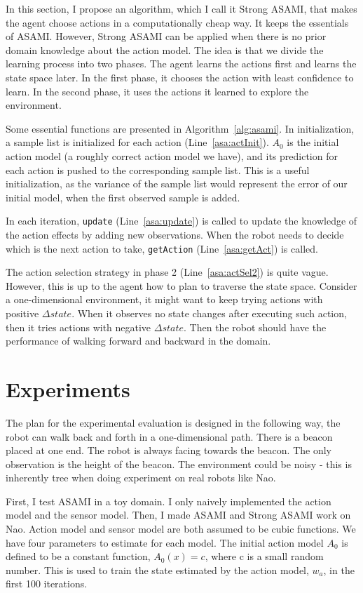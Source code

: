 \documentclass[10pt]{article}
\begin{document}
In this section, I propose an algorithm, which I call it Strong ASAMI,
that makes the agent choose actions in a computationally cheap way.
It keeps the essentials of ASAMI\@. However, Strong ASAMI can be applied
when there is no prior domain knowledge about the action model. The
idea is that we divide the learning process into two phases. The agent
learns the actions first and learns the state space later. In the
first phase, it chooses the action with least confidence to learn. In
the second phase, it uses the actions it learned to explore the
environment.

Some essential functions are presented in Algorithm~\ref{alg:asami}.
In initialization, a sample list is initialized for each action
(Line~\ref{asa:actInit}). $A_0$ is the initial action model (a roughly
correct action model we have), and its prediction for each action is
pushed to the corresponding sample list.  This is a useful
initialization, as the variance of the sample list would represent
the error of our initial model, when the first observed sample is
added.

In each iteration, \texttt{update} (Line~\ref{asa:update}) is called to update
the knowledge of the action effects by adding new observations. When
the robot needs to decide which is the next action to take,
\texttt{getAction} (Line~\ref{asa:getAct}) is called.

The action selection strategy in phase 2 (Line~\ref{asa:actSel2}) is
quite vague. However, this is up to the agent how to plan to traverse
the state space. Consider a one-dimensional environment, it might want
to keep trying actions with positive $\Delta state$. When it observes
no state changes after executing such action, then it tries actions
with negative $\Delta state$. Then the robot should have the
performance of walking forward and backward in the domain.

\section{Experiments}

The plan for the experimental evaluation is designed in the following
way, the robot can walk back and forth in a one-dimensional path.
There is a beacon placed at one end. The robot is always facing
towards the beacon. The only observation is the height of the beacon.
The environment could be noisy - this is inherently tree when doing
experiment on real robots like Nao.

First, I test ASAMI in a toy domain. I only naively implemented the action
model and the sensor model. Then, I made ASAMI and Strong ASAMI work on
Nao. Action model and sensor model are both assumed to be cubic
functions.  We have four parameters to estimate for each model. The
initial action model $A_0$ is defined to be a constant function,
$A_0(x) = c$, where c is a small random number. This is used to train
the state estimated by the action model, $w_a$, in the first 100
iterations.
\end{document}
